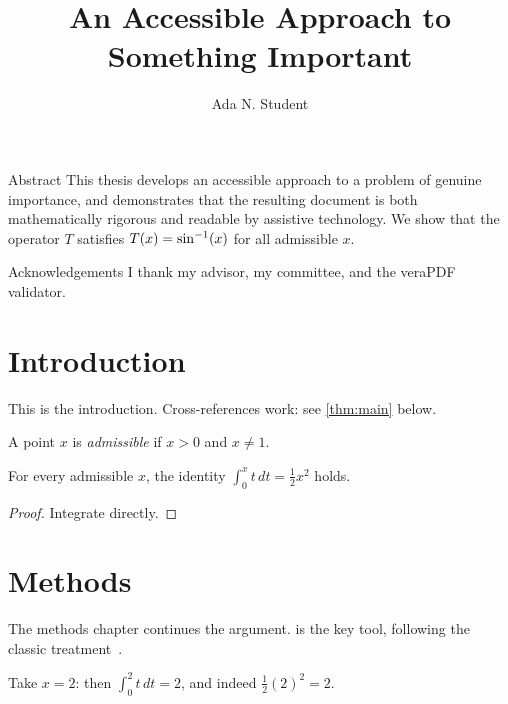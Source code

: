\documentclass{thesis}
\title{An Accessible Approach to Something Important}
\author{Ada N. Student}
\begin{document}
\makeUNRtitlepage
\makecopyrightpage
\committeeapprovalpage

\frontmatter

\begin{frontmatterpage}{Abstract}
This thesis develops an accessible approach to a problem of genuine importance,
and demonstrates that the resulting document is both mathematically rigorous and
readable by assistive technology. We show that the operator $T$ satisfies
$T(x) = \ThesisMathIntent{inverse-sine}{\sin^{-1}}(x)$ for all admissible $x$.
\end{frontmatterpage}

\begin{frontmatterpage}{Acknowledgements}
I thank my advisor, my committee, and the veraPDF validator.
\end{frontmatterpage}

\tableofcontents
\listoffigures

\mainmatter

\chapter{Introduction}
This is the introduction. Cross-references work: see \cref{thm:main} below.

\begin{definition}[Admissible]
A point $x$ is \emph{admissible} if $x > 0$ and $x \neq 1$.
\end{definition}

\begin{theorem}\label{thm:main}
For every admissible $x$, the identity $\int_0^x t \, dt = \tfrac{1}{2}x^2$ holds.
\end{theorem}

\begin{proof}
Integrate directly.
\end{proof}

\chapter{Methods}
The methods chapter continues the argument.  is the key tool,
following the classic treatment~\autocite{rudin1976}.

\begin{example}
Take $x = 2$: then $\int_0^2 t\,dt = 2$, and indeed $\tfrac{1}{2}(2)^2 = 2$.
\end{example}

\makereferences
\end{document}
